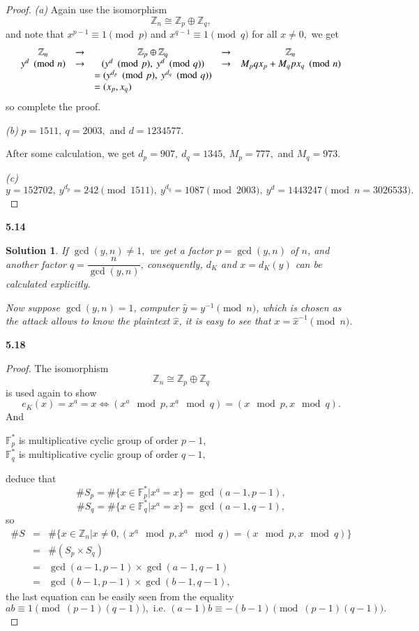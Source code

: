 \documentclass[12pt,a4paper]{article}
\newcommand{\llra}{\Longleftrightarrow}
\theoremstyle{solution}
\newtheorem*{sol}{Solution}
\begin{document}
\begin{proof}

{\em (a) }Again use the isomorphism
$$
\mathbb{Z}_n \cong \mathbb{Z}_p \oplus \mathbb{Z}_q,
$$
and note that $x^{p-1}\equiv 1 \pmod{p}$ and $x^{q-1}\equiv 1 \pmod{q}$ for all $x \neq 0,$
we get
$$
\begin{array}{cclcc}
\mathbb{Z}_n & \rightarrow & \multicolumn{1}{c}{\mathbb{Z}_p \oplus \mathbb{Z}_q}  & \rightarrow & \mathbb{Z}_n\\
y^d \pmod{n}         & \rightarrow  & ~~~(y^d \pmod{p},~y^d \pmod{q})& \rightarrow & M_p q x_p+M_q p x_q \pmod{n}\\
&&=(y^{d_p} \pmod{p},~y^{d_q} \pmod{q})&&\\
&&=(x_p,x_q)&&
\end{array}
$$
so complete the proof.

{\em (b) }$p=1511,~q=2003,$ and $d=1234577$.

After some calculation, we get $d_p=907,~d_q=1345,~M_p=777,$ and $M_q=973.$

{\em (c) }$y=152702,~y^{d_p}=242 \pmod{1511},~y^{d_q}=1087 \pmod{2003},~y^d=1443247 \pmod{n=3026533}.$
\end{proof}

\textbf{5.14}

\begin{sol}
If $\gcd(y,n)\neq 1,$ we get a factor $p=\gcd(y,n)$ of $n$, and another factor $q=\dfrac{n}{\gcd(y,n)}$, consequently, $d_K$ and $x=d_K(y)$ can be calculated explicitly.

Now suppose $\gcd(y,n)=1$, computer $\hat{y}=y^{-1}\pmod{n}$, which is chosen as the attack allows to know the plaintext $\hat{x}$, it is easy to see that $x=\hat{x}^{-1}\pmod{n}$.
\end{sol}

\textbf{5.18}

\begin{proof}
The isomorphism
$$
\mathbb{Z}_n \cong \mathbb{Z}_p \oplus \mathbb{Z}_q
$$
is used again to show
$$
e_K(x)=x^a=x \llra (x^a\mod p,x^a\mod q)=(x\mod p,x\mod q).
$$
And
\begin{center}
$\mathbb{F}_p^*$ is multiplicative cyclic group of order $p-1,$\\
$\mathbb{F}_q^*$ is multiplicative cyclic group of order $q-1,$\\
\end{center}
deduce that
$$
\#S_p=\#\{x\in \mathbb{F}_p^* | x^a =x\}=\gcd(a-1,p-1),
$$
$$
\#S_q=\#\{x\in \mathbb{F}_q^* | x^a =x\}=\gcd(a-1,q-1),
$$
so
$$
\begin{array}{rcl}
\#S&=&\# \{x\in \mathbb{Z}_n|x\neq0,(x^a\mod p,x^a\mod q)=(x\mod p,x\mod q)\}\\
&=&\#(S_p \times S_q)\\
&=&\gcd(a-1,p-1) \times \gcd(a-1,q-1)\\
&=&\gcd(b-1,p-1) \times \gcd(b-1,q-1),
\end{array}
$$
the last equation can be easily seen from the equality
$$
ab \equiv 1 \pmod{(p-1)(q-1)},\text{ i.e. }(a-1)b \equiv -(b-1) \pmod{(p-1)(q-1)}.
$$
\end{proof}
\end{document}

